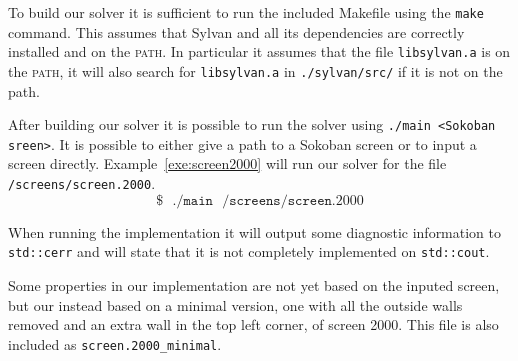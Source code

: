 To build our solver it is sufficient to run the included Makefile using the
\texttt{make} command. This assumes that Sylvan and all its dependencies are 
correctly installed and on the \textsc{path}. In particular it 
assumes that the file \texttt{libsylvan.a} is on the \textsc{path}, it will also
search for \texttt{libsylvan.a} in \texttt{./sylvan/src/} if it is not on the
path.

After building our solver it is possible to run the solver using 
\texttt{./main <Sokoban sreen>}. It is possible to either give a path to a
Sokoban screen or to input a screen directly. Example~\ref{exe:screen2000} will
run our solver for the file \texttt{/screens/screen.2000}.
\begin{equation}\label{exe:screen2000}
	\mathtt{\$}\text{ }\mathtt{./main}\text{ }\mathtt{/screens/screen.2000}
\end{equation}

When running the implementation it will output some diagnostic information to
\texttt{std::cerr} and will state that it is not completely implemented on 
\texttt{std::cout}. 

Some properties in our implementation are not yet based on the inputed screen, 
but our instead based on a minimal version, one with all the outside walls 
removed and an extra wall in the top left corner, of screen 2000. This file is 
also included as \texttt{screen.2000\_minimal}. 